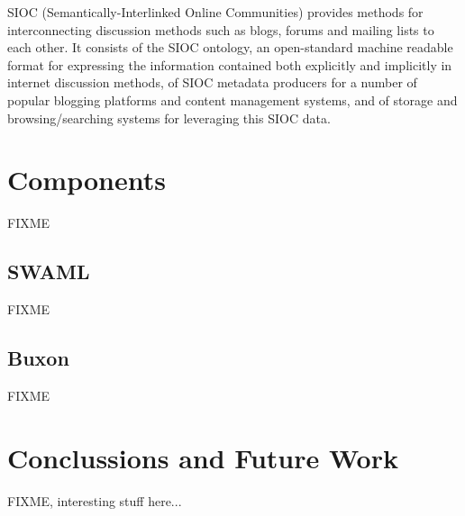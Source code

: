 \documentclass{llncs}
\begin{document}
SIOC (Semantically-Interlinked Online Communities) provides methods for 
interconnecting discussion methods such as blogs, forums and mailing lists 
to each other. It consists of the SIOC ontology, an open-standard machine 
readable format for expressing the information contained both explicitly 
and implicitly in internet discussion methods, of SIOC metadata producers 
for a number of popular blogging platforms and content management systems, 
and of storage and browsing/searching systems for leveraging this SIOC 
data. \cite{Breslin2005}

\section{Components}

FIXME

\subsection{SWAML}

FIXME

\subsection{Buxon}

FIXME

\section{Conclussions and Future Work}

FIXME, interesting stuff here...




%
\end{document}
